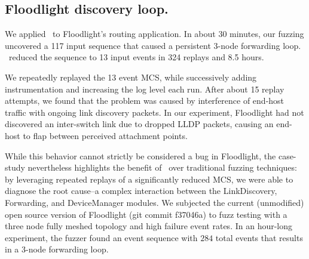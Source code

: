 \subsection{Floodlight discovery loop.}


We applied \projectname~to Floodlight's routing application.
In about 30 minutes, our fuzzing uncovered a
117 input sequence that caused a persistent 3-node forwarding loop.
\projectname~reduced the sequence to 13 input events in 324 replays and 8.5 hours.

We repeatedly replayed the 13 event MCS, while successively adding
instrumentation and increasing the log level each run. After about 15 replay
attempts, we found that the problem was caused by interference of end-host
traffic with ongoing link discovery packets. In our experiment, Floodlight had
not discovered an inter-switch link due to dropped LLDP packets, causing an
end-host to flap between perceived attachment points.

While this behavior cannot strictly be considered a bug in Floodlight,
the case-study nevertheless highlights the benefit of
\projectname~over traditional fuzzing techniques: by leveraging repeated replays
of a significantly reduced MCS, we were able to diagnose the root cause--a
complex interaction between the LinkDiscovery, Forwarding, and DeviceManager
modules.
We subjected the current (unmodified) open
source version of Floodlight (git commit f37046a) to fuzz testing with a three
node fully meshed topology and high failure event rates. In an hour-long experiment,
the fuzzer found an event sequence with $284$ total events
that results in a 3-node forwarding loop.



